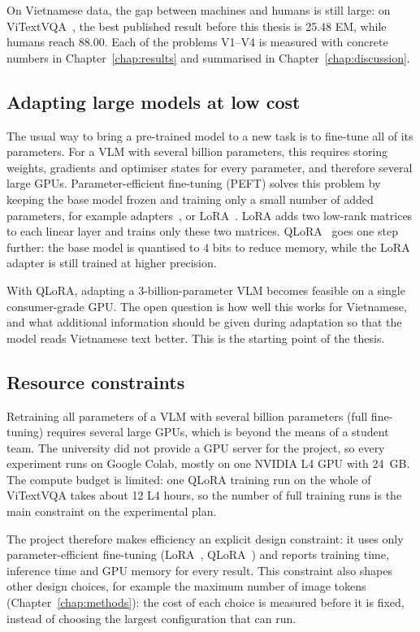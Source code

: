 On Vietnamese data, the gap between machines and humans is still large: on
ViTextVQA~\cite{nguyen2024vitextvqa}, the best published result before this thesis
is 25.48 EM, while humans reach 88.00. Each of the problems V1--V4 is measured
with concrete numbers in Chapter~\ref{chap:results} and summarised in
Chapter~\ref{chap:discussion}.

\subsection{Adapting large models at low cost}

The usual way to bring a pre-trained model to a new task is to fine-tune all of its
parameters. For a VLM with several billion parameters, this requires storing
weights, gradients and optimiser states for every parameter, and therefore several
large GPUs. Parameter-efficient fine-tuning (PEFT) solves this problem by keeping
the base model frozen and training only a small number of added parameters,
for example adapters~\cite{houlsby2019adapter}, \cite{sung2022vladapter} or
LoRA~\cite{hu2022lora}. LoRA adds two low-rank matrices to each linear layer and
trains only these two matrices. QLoRA~\cite{dettmers2023qlora} goes one step
further: the base model is quantised to 4 bits to reduce memory, while the LoRA
adapter is still trained at higher precision.

With QLoRA, adapting a 3-billion-parameter VLM becomes feasible on a single
consumer-grade GPU. The open question is how well this works for Vietnamese, and
what additional information should be given during adaptation so that the model
reads Vietnamese text better. This is the starting point of the thesis.

\subsection{Resource constraints}

Retraining all parameters of a VLM with several billion parameters (full
fine-tuning) requires several large GPUs, which is beyond the means of a student
team. The university did not provide a GPU server for the project, so every
experiment runs on Google Colab, mostly on one NVIDIA L4 GPU with 24~GB. The compute
budget is limited: one QLoRA training run on the whole of ViTextVQA takes about 12
L4 hours, so the number of full training runs is the main constraint on the
experimental plan.

The project therefore makes efficiency an explicit design constraint: it uses only
parameter-efficient fine-tuning (LoRA~\cite{hu2022lora},
QLoRA~\cite{dettmers2023qlora}) and reports training time, inference time and GPU
memory for every result. This constraint also shapes other design choices, for
example the maximum number of image tokens (Chapter~\ref{chap:methods}): the cost of
each choice is measured before it is fixed, instead of choosing the largest
configuration that can run.

